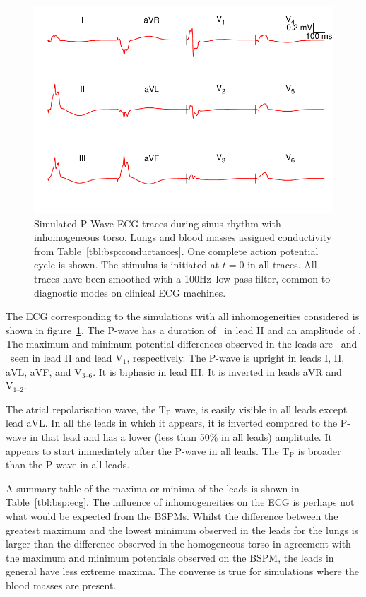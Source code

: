 \begin{figure}
\includegraphics{figures/bsp/ecg_all}
\caption[12 lead ECG during sinus rhythm, all internal inhomogeneities present.]{
\label{bsp:fig:ecg_all}
Simulated P-Wave ECG traces during sinus rhythm with inhomogeneous torso.
Lungs and blood masses assigned conductivity from Table~\ref{tbl:bsp:conductances}.
One complete action potential cycle is shown.
The stimulus is initiated at $t = 0$ in all traces.
All traces have been smoothed with a \unit{100}{Hz}\ low-pass filter, common to
diagnostic modes on clinical ECG machines.
}
\end{figure}

The ECG corresponding to the simulations with all inhomogeneities considered is shown in
figure~\ref{bsp:fig:ecg_all}.
The P-wave has a duration of \ in lead II and an amplitude of .
The maximum and minimum potential differences observed in the leads are
\ and \ seen in lead II and lead $\text{V}_{\text{1}}$, respectively.
The P-wave is upright in leads I, II, aVL, aVF, and $\text{V}_{\text{3--6}}$.
It is biphasic in lead III.
It is inverted in leads aVR and $\text{V}_{\text{1--2}}$.

The atrial repolarisation wave, the $\text{T}_{\text{P}}$ wave, is easily
visible in all leads except lead aVL.
In all the leads in which it appears, it is inverted compared to the P-wave in
that lead and has a lower (less than 50\% in all leads) amplitude.
It appears to start immediately after the P-wave in all leads.
The $\text{T}_{\text{P}}$ is broader than the P-wave in all leads.

A summary table of the maxima or minima of the leads is shown in
Table~\ref{tbl:bsp:ecg}.
The influence of inhomogeneities on the ECG is perhaps not what would be
expected from the BSPMs.
Whilst the difference between the greatest maximum and the lowest minimum
observed in the leads for the lungs is larger than the difference observed in
the homogeneous torso in agreement with the maximum and minimum potentials
observed on the BSPM, the leads in general have less extreme maxima.
The converse is true for simulations where the blood masses are present.


